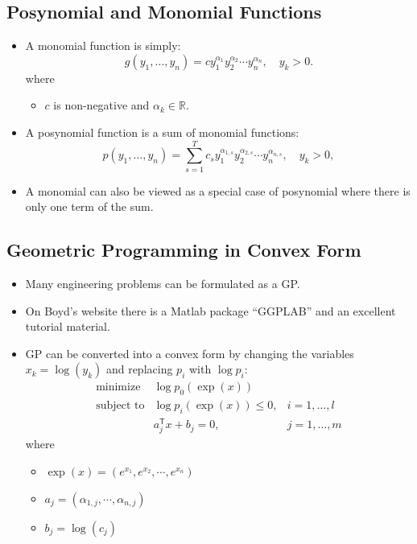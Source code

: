 \documentclass[
]{article}
\providecommand{\tightlist}{%
  \setlength{\itemsep}{0pt}\setlength{\parskip}{0pt}}
\begin{document}
\hypertarget{posynomial-and-monomial-functions}{%
\subsection{Posynomial and Monomial Functions}\label{posynomial-and-monomial-functions}}

\begin{itemize}
\tightlist
\item
  A monomial function is simply:
  \[g(y_1,\ldots,y_n) = c y_1^{{\alpha}_{1}} y_2^{{\alpha}_{2}} \cdots y_n^{{\alpha}_{n}}, \quad y_k > 0.\]
  where

  \begin{itemize}
  \tightlist
  \item
    \(c\) is non-negative and \({\alpha}_{k}\in {\mathbb{R}}\).
  \end{itemize}
\item
  A posynomial function is a sum of monomial functions:
  \[p(y_1,\ldots,y_n) = \sum_{s=1}^{T}{c_s y_1^{{\alpha}_{1,s}} y_2^{{\alpha}_{2,s}} \cdots y_n^{{\alpha}_{n,s}}}, \quad y_k > 0 ,\]
\item
  A monomial can also be viewed as a special case of posynomial where there is only one term of the sum.
\end{itemize}

\hypertarget{geometric-programming-in-convex-form}{%
\subsection{Geometric Programming in Convex Form}\label{geometric-programming-in-convex-form}}

\begin{itemize}
\tightlist
\item
  Many engineering problems can be formulated as a GP.
\item
  On Boyd's website there is a Matlab package ``GGPLAB'' and an excellent tutorial material.
\item
  GP can be converted into a convex form by changing the variables \(x_k = \log(y_k)\) and replacing \(p_i\) with \(\log p_i\):
  \[\begin{array}{lll}
        \text{minimize}   & \log p_0(\exp(x)) &  \\
        \text{subject to} & \log p_i(\exp(x)) \leq 0, & i=1,\ldots,l \\
        & a_j^\mathsf{T} x + b_j = 0, & j=1,\ldots,m
    \end{array}\]
  where

  \begin{itemize}
  \tightlist
  \item
    \(\exp(x) = (e^{x_1}, e^{x_2}, \cdots, e^{x_n})\)
  \item
    \(a_j = (\alpha_{1,j}, \cdots, \alpha_{n,j})\)
  \item
    \(b_j = \log(c_j)\)
  \end{itemize}
\end{itemize}
\end{document}

